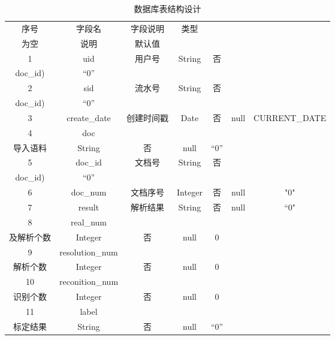 \begin{table}[h]
  \centering
  \caption{数据库表结构设计}
  \begin{tabular}{|*{7}{c|}}
    \hline
    序号 & 字段名          & 字段说明                 & 类型    & \makecell*[c]{是否                                              \\为空} & 说明                  & 默认值        \\
    \hline
    1    & uid             & 用户号                   & String  & 否                 & \makecell*[c]{PK(uid，sid，              \\doc\_id)} & “0”           \\
    \hline
    2    & sid             & 流水号                   & String  & 否                 & \makecell*[c]{PK(uid，sid，              \\doc\_id)} & “0”           \\
    \hline
    3    & create\_date    & 创建时间戳               & Date    & 否                 & null                       & CURRENT\_DATE \\
    \hline
    4    & doc             & \makecell*[c]{用户                                                                                   \\导入语料} & String  & 否       & null                  & “0”           \\
    \hline
    5    & doc\_id         & 文档号                   & String  & 否                 & \makecell*[c]{PK(uid，sid，              \\doc\_id)} & “0”           \\
    \hline
    6    & doc\_num        & 文档序号                 & Integer & 否                 & null                       & "0"           \\
    \hline
    7    & result          & 解析结果                 & String  & 否                 & null                       & “0"           \\
    \hline
    8    & real\_num       & \makecell*[c]{应该识别                                                                               \\及解析个数} & Integer & 否 & null & 0 \\
    \hline
    9    & resolution\_num & \makecell*[c]{实际正确                                                                               \\解析个数} & Integer & 否 & null & 0 \\
    \hline
    10   & reconition\_num & \makecell*[c]{实际正确                                                                               \\识别个数} & Integer & 否 & null  & 0 \\
    \hline
    11   & label           & \makecell*[c]{识别及解析                                                                             \\标定结果} & String & 否 & null & “0” \\
    \hline
  \end{tabular}
\end{table}

